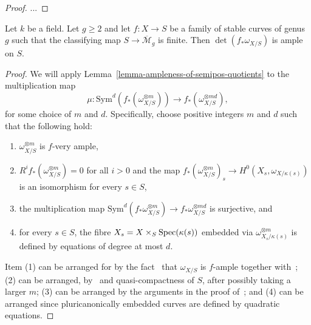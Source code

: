 \begin{proof}
  ...
\end{proof}

\begin{lemma}
\label{lemma-ample-determinant-of-rel-canonical}
Let $k$ be a field.
Let $g \geq 2$ and let $f : X \to S$ be a family of stable curves of genus $g$
such that the classifying map $S \to \overline{\mathcal{M}}_g$ is finite.
Then $\det(f_*\omega_{X/S})$ is ample on $S$.
\end{lemma}

\begin{proof}
We will apply Lemma~\ref{lemma-ampleness-of-semipos-quotients} to the
multiplication map
$$
\mu : \mathrm{Sym}^d(f_*(\omega_{X/S}^{\otimes m})) \to f_*(\omega_{X/S}^{\otimes md}),
$$
for some choice of $m$ and $d$.
Specifically, choose positive integers $m$ and $d$ such that the following
hold:
\begin{enumerate}
\item $\omega_{X/S}^{\otimes m}$ is $f$-very ample,
\item $R^if_*(\omega_{X/S}^{\otimes m}) = 0$ for all $i > 0$ and the
  map $f_*(\omega_{X/S}^{\otimes m})_s \to H^0(X_s,\omega_{X/\kappa(s)})$ is
  an isomorphism for every $s \in S$,
\item the multiplication map
  $\mathrm{Sym}^d(f_*\omega_{X/S}^{\otimes m}) \to f_*\omega_{X/S}^{\otimes md}$
  is surjective, and
\item for every $s \in S$, the fibre $X_s = X \times_S \mathop{\rm Spec}(\kappa(s))$
  embedded via $\omega_{X_s/\kappa(s)}^{\otimes m}$ is defined by equations
  of degree at most $d$.
\end{enumerate}
Item (1) can be arranged for by the fact~\cite[Corollary of (1.2)]{dm} that
$\omega_{X/S}$ is $f$-ample together with~;
(2) can be arranged, by~ and quasi-compactness of $S$, after
possibly taking a larger $m$;
(3) can be arranged by the arguments in the proof of~; and
(4) can be arranged since pluricanonically embedded curves are defined
by quadratic equations.


\end{proof}
